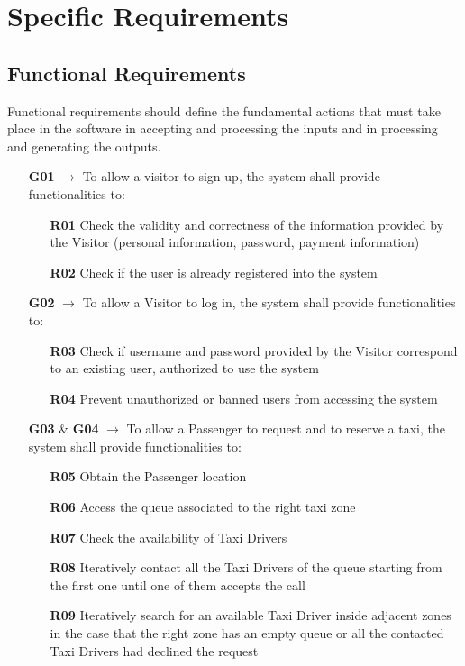 \chapter{Specific Requirements} \label{chap3}

\section{Functional Requirements}
Functional requirements should define the fundamental actions that must take place in the software in accepting and processing the inputs and in processing and generating the outputs.

\begin{itemize}
	\item [\textbf{G01}] $\rightarrow$ To allow a visitor to sign up, the system shall provide functionalities to:
	\begin{itemize}
		\item [\textbf{R01}] Check the validity and correctness of the information provided by the Visitor (personal information, password, payment information)
		\item [\textbf{R02}] Check if the user is already registered into the system 
	\end{itemize}
	
	\item [\textbf{G02}] $\rightarrow$ To allow a Visitor to log in, the system shall provide functionalities to:
	\begin{itemize}
		\item [\textbf{R03}] Check if username and password provided by the Visitor correspond to an existing user, authorized to use the system
		\item [\textbf{R04}] Prevent unauthorized or banned users from accessing the system 
	\end{itemize}
	
	\item [\textbf{G03}] \& \textbf{G04} $\rightarrow$ To allow a Passenger to request and to reserve a taxi, the system shall provide functionalities to:
	\begin{itemize}
		\item [\textbf{R05}] Obtain the Passenger location
		\item [\textbf{R06}] Access the queue associated to the right taxi zone
		\item [\textbf{R07}] Check the availability of Taxi Drivers
		\item [\textbf{R08}] Iteratively contact all the Taxi Drivers of the queue starting from the first one until one of them accepts the call
		\item [\textbf{R09}] Iteratively search for an available Taxi Driver inside adjacent zones in the case that the right zone has an empty queue or all the contacted Taxi Drivers had declined the request
	\end{itemize}
	

\end{itemize}
